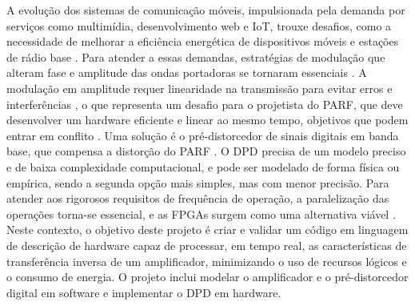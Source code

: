 A evolução dos sistemas de comunicação móveis, impulsionada pela demanda por serviços como multimídia, desenvolvimento web e IoT, trouxe desafios, como a necessidade de melhorar a eficiência energética de dispositivos móveis e estações de rádio base \cite{John2016}. Para atender a essas demandas, estratégias de modulação que alteram fase e amplitude das ondas portadoras se tornaram essenciais \cite{Kenington2000}. A modulação em amplitude requer linearidade na transmissão para evitar erros e interferências \cite{Cripps2006}, o que representa um desafio para o projetista do PARF, que deve desenvolver um hardware eficiente e linear ao mesmo tempo, objetivos que podem entrar em conflito \cite{Chavez2018}. Uma solução é o pré-distorcedor de sinais digitais em banda base, que compensa a distorção do PARF \cite{Cripps2006}. O DPD precisa de um modelo preciso e de baixa complexidade computacional, e pode ser modelado de forma física ou empírica, sendo a segunda opção mais simples, mas com menor precisão. Para atender aos rigorosos requisitos de frequência de operação, a paralelização das operações torna-se essencial, e as FPGAs surgem como uma alternativa viável \cite{Pedroni2010}. Neste contexto, o objetivo deste projeto é criar e validar um código em linguagem de descrição de hardware capaz de processar, em tempo real, as características de transferência inversa de um amplificador, minimizando o uso de recursos lógicos e o consumo de energia. O projeto inclui modelar o amplificador e o pré-distorcedor digital em software e implementar o DPD em hardware.